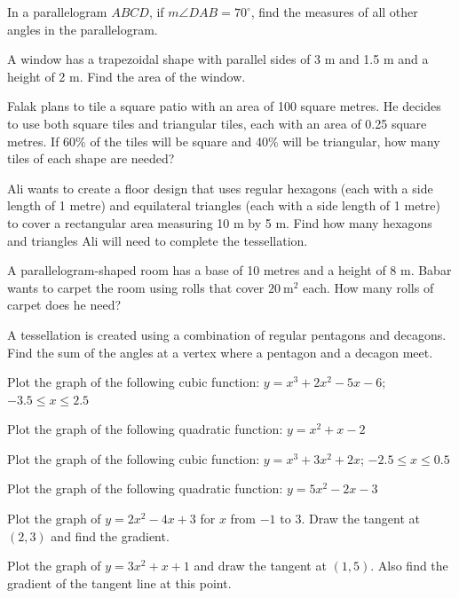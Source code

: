 \documentclass[11pt]{article}
\begin{document}
\begin{wq}[start=287]
\item In a parallelogram $ABCD$, if $m\angle DAB=70^{\circ}$, find the measures of all other angles in the parallelogram.

\item A window has a trapezoidal shape with parallel sides of 3 m and 1.5 m and a height of 2 m. Find the area of the window.

\item Falak plans to tile a square patio with an area of 100 square metres. He decides to use both square tiles and triangular tiles, each with an area of 0.25 square metres. If 60\% of the tiles will be square and 40\% will be triangular, how many tiles of each shape are needed?

\item Ali wants to create a floor design that uses regular hexagons (each with a side length of 1 metre) and equilateral triangles (each with a side length of 1 metre) to cover a rectangular area measuring 10 m by 5 m. Find how many hexagons and triangles Ali will need to complete the tessellation.

\item A parallelogram-shaped room has a base of 10 metres and a height of 8 m. Babar wants to carpet the room using rolls that cover $20\ \text{m}^2$ each. How many rolls of carpet does he need?

\item A tessellation is created using a combination of regular pentagons and decagons. Find the sum of the angles at a vertex where a pentagon and a decagon meet.

\item Plot the graph of the following cubic function: $y=x^3+2x^2-5x-6$; $-3.5\le x\le 2.5$

\item Plot the graph of the following quadratic function: $y=x^2+x-2$

\item Plot the graph of the following cubic function: $y=x^3+3x^2+2x$; $-2.5\le x\le 0.5$

\item Plot the graph of the following quadratic function: $y=5x^2-2x-3$

\item Plot the graph of $y=2x^2-4x+3$ for $x$ from $-1$ to $3$. Draw the tangent at $(2,3)$ and find the gradient.

\item Plot the graph of $y=3x^2+x+1$ and draw the tangent at $(1,5)$. Also find the gradient of the tangent line at this point.


\end{wq}
\end{document}
